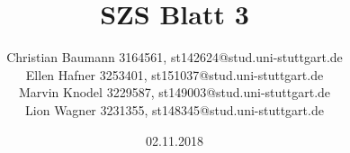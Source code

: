 \documentclass[a4paper, 15pt]{scrartcl}
\title{SZS Blatt 3}
\author{
	Christian Baumann 3164561, st142624@stud.uni-stuttgart.de \\ 
	Ellen Hafner 3253401, st151037@stud.uni-stuttgart.de \\ 
	Marvin Knodel 3229587, st149003@stud.uni-stuttgart.de\\ 
	Lion Wagner 3231355, st148345@stud.uni-stuttgart.de}
\date{02.11.2018}
\begin{document}
	\maketitle
	\newpage
		\mbox{}
		
	\newpage
		
	\newpage
		
\end{document}
